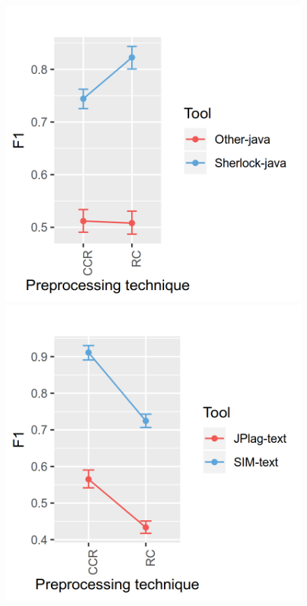 \documentclass[a4paper, 12pt, oneside, openany, final, pdftex]{book}\usepackage[]{graphicx}\usepackage[]{color}
\makeatletter
\def\maxwidth{ %
  \ifdim\Gin@nat@width>\linewidth
    \linewidth
  \else
    \Gin@nat@width
  \fi
}
\makeatother
\begin{document}
\begin{appendices}
\begin{figure}[ht]
\label{fig:interaction- 12 for SOCO D1 }\endminipage\hfill {} 
\includegraphics[width=\maxwidth]{figure/Figure-SOCO-INTERACTION-13} 
\label{fig:interaction- 13 for SOCO D1 }\endminipage\hfill {} 
\includegraphics[width=\maxwidth]{figure/Figure-SOCO-INTERACTION-14} 

\end{figure}
\end{appendices}
\end{document}
